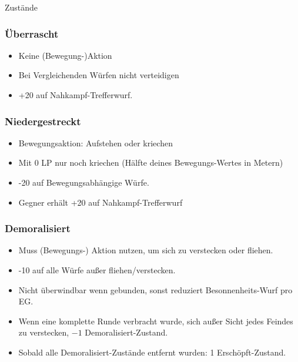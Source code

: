 \documentclass{article}
\begin{document}
\begin{multicols*}{3}
\begin{slsframe}{Zustände}
    \subsubsection*{Überrascht}
        \begin{itemize}%
            \item Keine (Bewegung-)Aktion 
            \item Bei Vergleichenden Würfen nicht verteidigen
            \item +20 auf Nahkampf-Trefferwurf.
        \end{itemize}   

    \subsubsection*{Niedergestreckt}
        \begin{itemize}%
            \item Bewegungsaktion: Aufstehen oder kriechen 
            \item Mit 0 LP nur noch kriechen (Hälfte deines Bewegungs-Wertes in Metern)
            \item -20 auf Bewegungsabhängige Würfe.
            \item Gegner erhält +20 auf Nahkampf-Trefferwurf
        \end{itemize}   
        

    \subsubsection*{Demoralisiert}
        \begin{itemize}%
            \item Muss (Bewegungs-) Aktion nutzen, um sich zu verstecken oder fliehen.
            \item -10 auf alle Würfe außer fliehen/verstecken.
            \item Nicht überwindbar wenn gebunden, sonst reduziert Besonnenheits-Wurf pro EG.
            \item Wenn eine komplette Runde verbracht wurde, sich außer Sicht jedes Feindes zu verstecken, $-1$ Demoralisiert-Zustand.
            \item Sobald alle Demoralisiert-Zustände entfernt wurden: 1 Erschöpft-Zustand.
        \end{itemize}   
\end{slsframe}
        

\end{multicols*}
\end{document}
